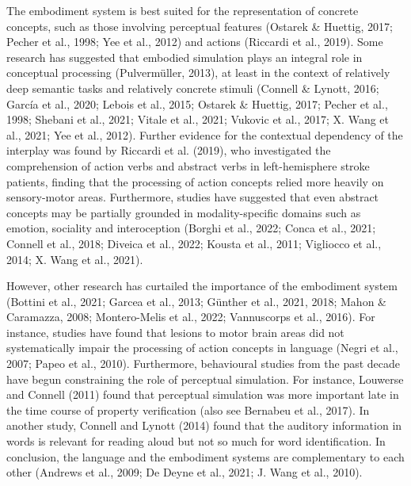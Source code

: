 \documentclass[
  12pt,
  man,floatsintext]{apa7}
\begin{document}
The embodiment system is best suited for the representation of concrete concepts, such as those involving perceptual features (Ostarek \& Huettig, 2017; Pecher et al., 1998; Yee et al., 2012) and actions (Riccardi et al., 2019). Some research has suggested that embodied simulation plays an integral role in conceptual processing (Pulvermüller, 2013), at least in the context of relatively deep semantic tasks and relatively concrete stimuli (Connell \& Lynott, 2016; García et al., 2020; Lebois et al., 2015; Ostarek \& Huettig, 2017; Pecher et al., 1998; Shebani et al., 2021; Vitale et al., 2021; Vukovic et al., 2017; X. Wang et al., 2021; Yee et al., 2012). Further evidence for the contextual dependency of the interplay was found by Riccardi et al. (2019), who investigated the comprehension of action verbs and abstract verbs in left-hemisphere stroke patients, finding that the processing of action concepts relied more heavily on sensory-motor areas. Furthermore, studies have suggested that even abstract concepts may be partially grounded in modality-specific domains such as emotion, sociality and interoception (Borghi et al., 2022; Conca et al., 2021; Connell et al., 2018; Diveica et al., 2022; Kousta et al., 2011; Vigliocco et al., 2014; X. Wang et al., 2021).

However, other research has curtailed the importance of the embodiment system (Bottini et al., 2021; Garcea et al., 2013; Günther et al., 2021, 2018; Mahon \& Caramazza, 2008; Montero-Melis et al., 2022; Vannuscorps et al., 2016). For instance, studies have found that lesions to motor brain areas did not systematically impair the processing of action concepts in language (Negri et al., 2007; Papeo et al., 2010). Furthermore, behavioural studies from the past decade have begun constraining the role of perceptual simulation. For instance, Louwerse and Connell (2011) found that perceptual simulation was more important late in the time course of property verification (also see Bernabeu et al., 2017). In another study, Connell and Lynott (2014) found that the auditory information in words is relevant for reading aloud but not so much for word identification. In conclusion, the language and the embodiment systems are complementary to each other (Andrews et al., 2009; De Deyne et al., 2021; J. Wang et al., 2010).
\end{document}

